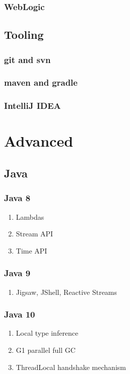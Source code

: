 \documentclass[11pt, twocolumn]{article}
\begin{document}
\subsubsection{WebLogic}

\subsection{Tooling}

\subsubsection{git and svn}

\subsubsection{maven and gradle}

\subsubsection{IntelliJ IDEA}

\section{Advanced}

\subsection{Java}

\subsubsection{Java 8}
\begin{enumerate}
	\item Lambdas
	\item Stream API
	\item Time API
\end{enumerate}

\subsubsection{Java 9}
\begin{enumerate}
	\item Jigsaw, JShell, Reactive Streams
\end{enumerate}

\subsubsection{Java 10}
\begin{enumerate}
	\item Local type inference
	\item G1 parallel full GC
	\item ThreadLocal handshake mechanism
\end{enumerate}
\end{document}
